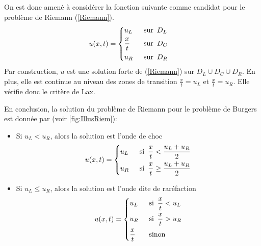 \documentclass[
	french,
	11pt, %
]{fphw}
\newcommand{\hquad}{\hspace{0.5em}} %
\begin{document}
\begin{itemize}[label=$\blacksquare$]
	On est donc amené à considérer la fonction suivante comme candidat pour le problème de Riemann (\ref{Riemann}).
	\begin{align*}
		u(x, t) &= 
		\begin{dcases}
			u_L \hquad & \text{sur} \hquad D_L\\	
			\frac{x}{t} \hquad & \text{sur} \hquad D_C \\	
			u_R \hquad & \text{sur} \hquad D_R
		\end{dcases}
	\end{align*}
	Par construction, $u$ est une solution forte de (\ref{Riemann}) sur $D_L \cup D_C \cup D_R$. En plus, elle est continue au niveau des zones de transition $\frac{x}{t} = u_L$ et $\frac{x}{t} = u_R$. Elle vérifie donc le critère de Lax.
	
\end{itemize}

\noindent En conclusion, la solution du problème de Riemann pour le problème de Burgers est donnée par (voir \cref{fig:IllusRiem}):
\begin{itemize}[label=$\blacksquare$]
	\item Si $ u_L < u_R $, alors la solution est l'onde de choc $$ 	u(x,t) =
	\begin{dcases}
		u_L \hquad & \text{si} \hquad \frac{x}{t} < \frac{u_L + u_R}{2} \\	
		u_R \hquad & \text{si} \hquad \frac{x}{t} \geq \frac{u_L + u_R}{2}
	\end{dcases}$$
	\item Si $ u_L \leq u_R $, alors la solution est l'onde dite de raréfaction $$u(x, t) = 
	\begin{dcases}
		u_L \hquad & \text{si} \hquad \frac{x}{t} < u_L\\	
		u_R \hquad & \text{si} \hquad \frac{x}{t} > u_R \\	
		\frac{x}{t} \hquad & \text{sinon}
	\end{dcases}$$
\end{itemize}
\end{document}
